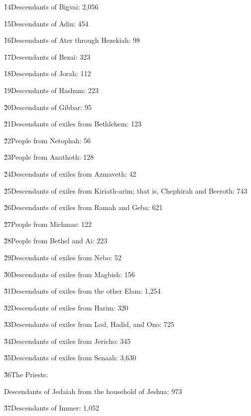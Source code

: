 \v{14}Descendants of Bigvai: 2,056

\v{15}Descendants of Adin: 454

\v{16}Descendants of Ater through Hezekiah: 98

\v{17}Descendants of Bezai: 323

\v{18}Descendants of Jorah: 112

\v{19}Descendants of Hashum: 223

\v{20}Descendants of Gibbar: 95

\v{21}Descendants of exiles from Bethlehem: 123

\v{22}People from Netophah: 56

\v{23}People from Anathoth: 128

\v{24}Descendants of exiles from Azmaveth: 42

\v{25}Descendants of exiles from Kiriath-arim; that is, Chephirah and Beeroth: 743

\v{26}Descendants of exiles from Ramah and Geba: 621

\v{27}People from Michmas: 122

\v{28}People from Bethel and Ai: 223

\v{29}Descendants of exiles from Nebo: 52

\v{30}Descendants of exiles from Magbish: 156

\v{31}Descendants of exiles from the other Elam: 1,254

\v{32}Descendants of exiles from Harim: 320

\v{33}Descendants of exiles from Lod, Hadid, and Ono: 725

\v{34}Descendants of exiles from Jericho: 345

\v{35}Descendants of exiles from Senaah: 3,630

\v{36}The Priests:

Descendants of Jedaiah from the household of Jeshua: 973

\v{37}Descendants of Immer: 1,052

